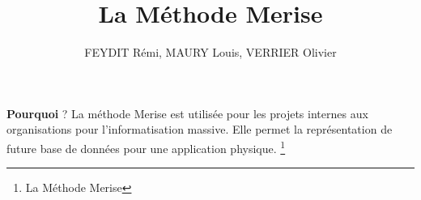 \documentclass{beamer}
\begin{document}
\begin{frame}{\textbf{Pourquoi} ?}
La méthode Merise est utilisée pour les projets internes aux organisations pour l’informatisation massive.
Elle permet la représentation de future base de données pour une application physique.
\footnote{La Méthode Merise}
\end{frame}

\begin{frame}
\title{La Méthode Merise} %
\author{FEYDIT Rémi, MAURY Louis, VERRIER Olivier}
\titlepage
\end{frame}
\end{document}

